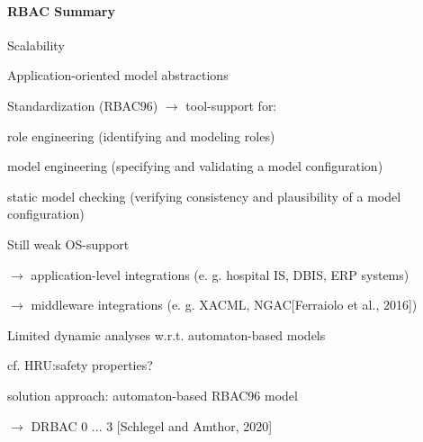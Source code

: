 \documentclass[a4paper]{article}
\begin{document}
\begin{multicols}{3}
    \paragraph{RBAC Summary}
    \begin{itemize*}
        \item Scalability
        \item Application-oriented model abstractions
        \item Standardization (RBAC96) $\rightarrow$ tool-support for:
        \begin{itemize*}
            \item role engineering (identifying and modeling roles)
            \item model engineering (specifying and validating a model configuration)
            \item static model checking (verifying consistency and plausibility of a model configuration)
        \end{itemize*}
        \item Still weak OS-support
        \begin{itemize*}
            \item $\rightarrow$ application-level integrations (e. g. hospital IS, DBIS, ERP systems)
            \item $\rightarrow$ middleware integrations (e. g. XACML, NGAC[Ferraiolo et al., 2016])
        \end{itemize*}
        \item Limited dynamic analyses w.r.t. automaton-based models
        \begin{itemize*}
            \item cf. HRU:safety properties?
            \item solution approach: automaton-based RBAC96 model
            \item $\rightarrow$ DRBAC 0 ... 3 [Schlegel and Amthor, 2020]
        \end{itemize*}
    \end{itemize*}



\end{multicols}
\end{document}
